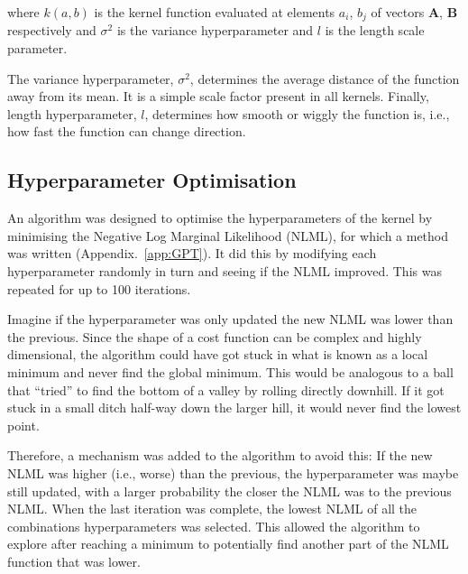 \documentclass[12pt]{article}
\begin{document}
    \noindent where $k(a,b)$ is the kernel function evaluated at elements $a_i$, $b_j$ of vectors $\mathbf{A}$, $\mathbf{B}$ respectively and $\sigma^2$ is the variance hyperparameter and $l$ is the length scale parameter.

    The variance hyperparameter, $\sigma^2$, determines the average distance of the function away from its mean.
    It is a simple scale factor present in all kernels.
    Finally, length hyperparameter, $l$, determines how smooth or wiggly the function is, i.e., how fast the function can change direction.

    \subsection{Hyperparameter Optimisation}
    An algorithm was designed to optimise the hyperparameters of the kernel by minimising the Negative Log Marginal Likelihood (NLML), for which a method was written (Appendix.~\ref{app:GPT}).
    It did this by modifying each hyperparameter randomly in turn and seeing if the NLML improved.
    This was repeated for up to 100 iterations.

    Imagine if the hyperparameter was only updated the new NLML was lower than the previous.
    Since the shape of a cost function can be complex and highly dimensional, the algorithm could have got stuck in what is known as a local minimum and never find the global minimum.
    This would be analogous to a ball that ``tried'' to find the bottom of a valley by rolling directly downhill.
    If it got stuck in a small ditch half-way down the larger hill, it would never find the lowest point.

    Therefore, a mechanism was added to the algorithm to avoid this:
    If the new NLML was higher (i.e., worse) than the previous, the hyperparameter was maybe still updated, with a larger probability the closer the NLML was to the previous NLML\@.
    When the last iteration was complete, the lowest NLML of all the combinations hyperparameters was selected.
    This allowed the algorithm to explore after reaching a minimum to potentially find another part of the NLML function that was lower.
\end{document}
